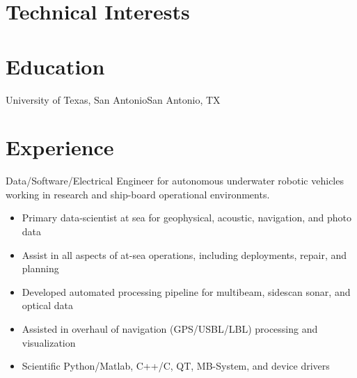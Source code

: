 \documentclass[11pt,a4paper,sans]{moderncv}
\begin{document}
\maketitle
%
\section{Technical Interests} 

\section{Education}
        {University of Texas, San Antonio}{San Antonio, TX}{}{}

\section{Experience}

{
Data/Software/Electrical Engineer for autonomous underwater robotic vehicles working in research and ship-board operational environments.
    \begin{itemize}
        \item Primary data-scientist at sea for geophysical, acoustic, navigation, and photo data
        \item Assist in all aspects of at-sea operations, including deployments, repair, and planning 
        \item Developed automated processing pipeline for multibeam, sidescan sonar, and optical data
        \item Assisted in overhaul of navigation (GPS/USBL/LBL) processing and visualization 
        \item Scientific Python/Matlab, C++/C, QT, MB-System, and device drivers
    \end{itemize}
}
\end{document}
